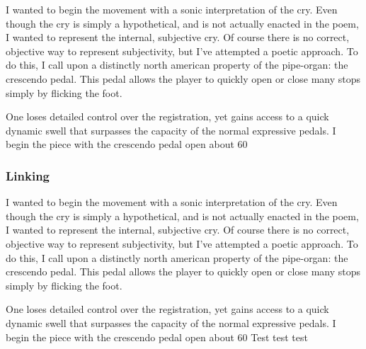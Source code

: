 \documentclass[12pt,twoside,maitrise]{dms}
\theoremstyle{definition}
\begin{document}

I wanted to begin the movement with a sonic interpretation of the cry. Even though the cry is simply a hypothetical, and is not actually enacted in the poem, I wanted to represent the internal, subjective cry. Of course there is no correct, objective way to represent subjectivity, but I've attempted a poetic approach. To do this, I call upon a distinctly north american property of the pipe-organ: the crescendo pedal. This pedal allows the player to quickly open or close many stops simply by flicking the foot. 

One loses detailed control over the registration, yet gains access to a quick dynamic swell that surpasses the capacity of the normal expressive pedals. I begin the piece with the crescendo pedal open about 60%

\subsubsection{Linking}

I wanted to begin the movement with a sonic interpretation of the cry. Even though the cry is simply a hypothetical, and is not actually enacted in the poem, I wanted to represent the internal, subjective cry. Of course there is no correct, objective way to represent subjectivity, but I've attempted a poetic approach. To do this, I call upon a distinctly north american property of the pipe-organ: the crescendo pedal. This pedal allows the player to quickly open or close many stops simply by flicking the foot. 

One loses detailed control over the registration, yet gains access to a quick dynamic swell that surpasses the capacity of the normal expressive pedals. I begin the piece with the crescendo pedal open about 60%
Test test test
\end{document}
